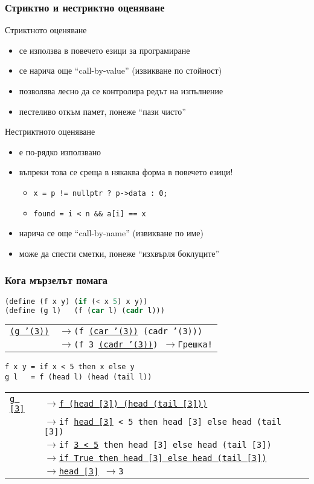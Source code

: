 \documentclass[alsotrans,beameroptions={aspectratio=169}]{beamerswitch}
\newcommand{\lra}{\onslide<+->$\longrightarrow$\xspace}
\begin{document}
\begin{frame}
  \frametitle{Стриктно и нестриктно оценяване}

  Стриктното оценяване
  \begin{itemize}[<+->]
  \item се използва в повечето езици за програмиране
  \item се нарича още ``call-by-value'' (извикване по стойност)
  \item позволява лесно да се контролира редът на изпълнение
  \item пестеливо откъм памет, понеже ``пази чисто''
  \end{itemize}
  \onslide<+->
  Нестриктното оценяване
  \begin{itemize}[<+->]
  \item е по-рядко използвано
  \item въпреки това се среща в някаква форма в повечето езици!
    \begin{itemize}
    \item \tt{x = p != nullptr ? p->data : 0;}
    \item \tt{found = i < n \&\& a[i] == x}
    \end{itemize}
  \item нарича се още ``call-by-name'' (извикване по име)
  \item може да спести сметки, понеже ``изхвърля боклуците''
  \end{itemize}
\end{frame}

\begin{frame}[fragile]
  \frametitle{Кога мързелът помага}

\begin{lstlisting}[language=Scheme]
(define (f x y) (if (< x 5) x y))
(define (g l)   (f (car l) (cadr l)))
\end{lstlisting}
\pause
\begin{tabular}[t]{l@{}l}
\tt{\underline{(g '(3))}}
&\lra \tt{(f \underline{(car '(3))} (cadr '(3)))}\\
&\lra \tt{(f 3 \underline{(cadr '(3))})}
\lra \alert{Грешка!}
\end{tabular}
\onslide<+->
\begin{lstlisting}
f x y = if x < 5 then x else y
g l   = f (head l) (head (tail l))
\end{lstlisting}
\onslide<+->
\begin{tabular}[t]{l@{}l}
\tt{\underline{g [3]}}
&\lra \tt{\underline{f (head [3]) (head (tail [3]))}}\\
&\lra \tt{if} \underline{\tt{head [3]}} \tt{< 5 then head [3] else head (tail [3])}\\
&\lra \tt{if \underline{3 < 5} then head [3] else head (tail [3])}\\
&\lra \tt{\underline{if True then head [3] else head (tail [3])}}\\
&\lra \tt{\underline{head [3]}}
\lra \tt 3
\end{tabular}
\end{frame}
\end{document}
